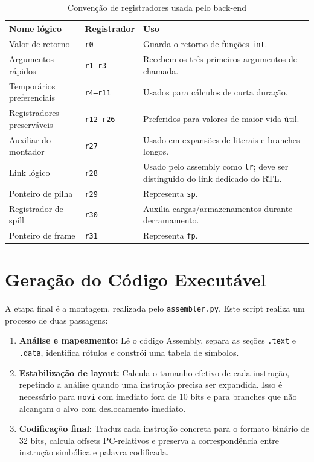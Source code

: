 \documentclass[
	12pt,				%
	oneside,
	a4paper,			%
	english,			%
	french,				%
	spanish,			%
	brazil,				%
	]{abntex2}
\begin{document}
\begin{table}[H]
    \centering
    \ABNTEXfontereduzida
    \caption{Convenção de registradores usada pelo back-end}
    \label{tab:convencao_registradores}
    \begin{tabular}{|p{}|p{}|p{}|}
        \hline
        \textbf{Nome lógico} & \textbf{Registrador} & \textbf{Uso} \\
        \hline
        Valor de retorno & \texttt{r0} & Guarda o retorno de funções \texttt{int}. \\
        \hline
        Argumentos rápidos & \texttt{r1--r3} & Recebem os três primeiros argumentos de chamada. \\
        \hline
        Temporários preferenciais & \texttt{r4--r11} & Usados para cálculos de curta duração. \\
        \hline
        Registradores preserváveis & \texttt{r12--r26} & Preferidos para valores de maior vida útil. \\
        \hline
        Auxiliar do montador & \texttt{r27} & Usado em expansões de literais e branches longos. \\
        \hline
        Link lógico & \texttt{r28} & Usado pelo assembly como \texttt{lr}; deve ser distinguido do link dedicado do RTL. \\
        \hline
        Ponteiro de pilha & \texttt{r29} & Representa \texttt{sp}. \\
        \hline
        Registrador de spill & \texttt{r30} & Auxilia cargas/armazenamentos durante derramamento. \\
        \hline
        Ponteiro de frame & \texttt{r31} & Representa \texttt{fp}. \\
        \hline
    \end{tabular}
\end{table}

\section{Geração do Código Executável}

A etapa final é a montagem, realizada pelo \texttt{assembler.py}. Este script realiza um processo de duas passagens:
\begin{enumerate}
    \item \textbf{Análise e mapeamento:} Lê o código Assembly, separa as seções \texttt{.text} e \texttt{.data}, identifica rótulos e constrói uma tabela de símbolos.
    \item \textbf{Estabilização de layout:} Calcula o tamanho efetivo de cada instrução, repetindo a análise quando uma instrução precisa ser expandida. Isso é necessário para \texttt{movi} com imediato fora de 10 bits e para branches que não alcançam o alvo com deslocamento imediato.
    \item \textbf{Codificação final:} Traduz cada instrução concreta para o formato binário de 32 bits, calcula offsets PC-relativos e preserva a correspondência entre instrução simbólica e palavra codificada.
\end{enumerate}
\end{document}
